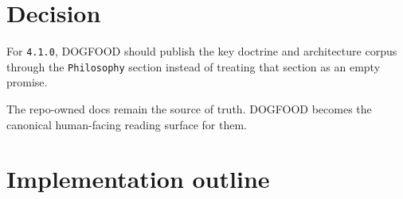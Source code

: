 \section{Decision}\label{record-085-decision}

For \texttt{4\allowbreak{}.\allowbreak{}1\allowbreak{}.\allowbreak{}0}, DOGFOOD should publish the key doctrine and architecture corpus through the \texttt{P\allowbreak{}h\allowbreak{}i\allowbreak{}l\allowbreak{}o\allowbreak{}s\allowbreak{}o\allowbreak{}p\allowbreak{}h\allowbreak{}y} section instead of treating that section as an empty promise.

The repo-owned docs remain the source of truth. DOGFOOD becomes the canonical human-facing reading surface for them.

\section{Implementation outline}\label{record-085-implementation-outline}

